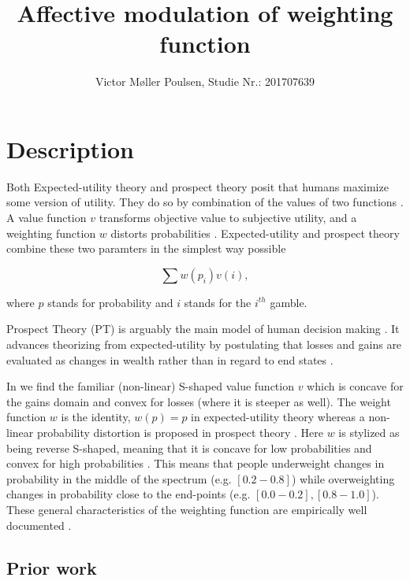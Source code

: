 \documentclass[12pt]{article}
\title{Affective modulation of weighting function}
\author{Victor Møller Poulsen, Studie Nr.: 201707639}
\begin{document}
\maketitle
\leavevmode

\section{Description}
Both Expected-utility theory and prospect theory
posit that humans maximize some version of
utility.
They do so by combination of the values
of two functions \autocite{rottenstreich2001money}.
A value function $v$ transforms objective value to
subjective utility, and a weighting function $w$
distorts probabilities \autocite{rottenstreich2001money,
gonzalez1999shape}. Expected-utility and
prospect theory combine these two paramters in
the simplest way possible
\autocite{rottenstreich2001money}

\[
	\sum w(p_i)v(i),
\]

where $p$ stands for probability and $i$ stands for the
$i^{th}$ gamble.

Prospect Theory \autocite{PT,
tversky1992advances} (PT) is arguably the main model
of human decision making \autocite{
newell2015straight}. It advances theorizing
from expected-utility by postulating that losses and
gains are evaluated as changes in wealth rather
than in regard to end states \autocite{newell2015straight}.

\vspace{3mm}

In \textcite{PT} we find the familiar
(non-linear) S-shaped
value function $v$ which is concave for the gains
domain and convex for losses (where it is steeper as well).
The weight function $w$ is the identity,
$w(p) = p$ in expected-utility theory
\autocite{rottenstreich2001money} whereas
a non-linear probability distortion is proposed in
prospect theory \autocite{PT}. Here $w$
is stylized as being reverse S-shaped,
meaning that it is concave for low probabilities
and convex for high probabilities \textcite{
gonzalez1999shape}. This means that
people underweight changes in probability in
the middle of the spectrum (e.g. $[0.2-0.8]$)
while overweighting changes in probability close
to the end-points (e.g. $[0.0 - 0.2], [0.8 - 1.0]$).
These general characteristics of the weighting
function are empirically well documented
\autocite{tversky1992advances,
wu1996curvature}.

\subsection{Prior work}
\end{document}
